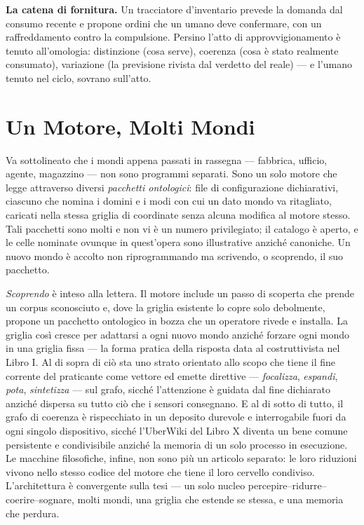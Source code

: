 \textbf{La catena di fornitura.} Un tracciatore d'inventario prevede la domanda dal
consumo recente e propone ordini che un umano deve confermare,
con un raffreddamento contro la compulsione. Persino l'atto di
approvvigionamento \`e tenuto all'omologia: distinzione (cosa serve), coerenza
(cosa \`e stato realmente consumato), variazione (la previsione rivista dal
verdetto del reale) --- e l'umano tenuto nel ciclo, sovrano sull'atto.

\section*{Un Motore, Molti Mondi}

Va sottolineato che i mondi appena passati in rassegna --- fabbrica, ufficio,
agente, magazzino --- non sono programmi separati. Sono un solo motore che legge
attraverso diversi \emph{pacchetti ontologici}: file di configurazione
dichiarativi, ciascuno che nomina i domini e i modi con cui un dato mondo va
ritagliato, caricati nella stessa griglia di coordinate senza alcuna modifica al
motore stesso. Tali pacchetti sono molti e non vi \`e un numero privilegiato; il
catalogo \`e aperto, e le celle nominate ovunque in quest'opera sono illustrative
anzich\'e canoniche. Un nuovo mondo \`e accolto non riprogrammando ma scrivendo, o
scoprendo, il suo pacchetto.

\emph{Scoprendo} \`e inteso alla lettera. Il motore include un passo di scoperta
che prende un corpus sconosciuto e, dove la griglia esistente lo copre solo
debolmente, propone un pacchetto ontologico in bozza che un operatore rivede e
installa. La griglia cos\`i cresce
per adattarsi a ogni nuovo mondo anzich\'e forzare ogni mondo in una griglia fissa
--- la forma pratica della risposta data al costruttivista nel Libro I. Al di
sopra di ci\`o sta uno strato orientato allo scopo che tiene il fine corrente del
praticante come vettore ed emette direttive --- \emph{focalizza}, \emph{espandi},
\emph{pota}, \emph{sintetizza} --- sul grafo, sicch\'e l'attenzione \`e guidata dal
fine dichiarato anzich\'e dispersa su tutto ci\`o che i sensori consegnano. E al di
sotto di tutto, il grafo di coerenza \`e rispecchiato in un deposito durevole e
interrogabile fuori da ogni singolo dispositivo, sicch\'e l'UberWiki del Libro X
diventa un bene comune persistente e condivisibile anzich\'e la memoria di un solo
processo in esecuzione. Le macchine filosofiche, infine, non sono pi\`u un
articolo separato: le loro riduzioni vivono nello stesso codice del motore che
tiene il loro cervello condiviso. L'architettura \`e convergente sulla tesi --- un
solo nucleo percepire--ridurre--coerire--sognare, molti mondi, una griglia che
estende se stessa, e una memoria che perdura.

